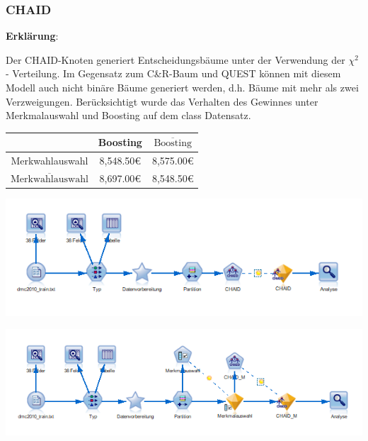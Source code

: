 \documentclass[a4paper,12pt]{article}
\begin{document}
\subsubsection{CHAID}
{\bf Erklärung}:
\par
\vspace{0.2cm}
Der CHAID-Knoten generiert Entscheidungsbäume unter der Verwendung der $\chi^2$  - Verteilung.
Im Gegensatz zum C\&R-Baum  und QUEST können mit diesem Modell auch nicht binäre Bäume generiert werden, d.h. Bäume mit mehr als zwei
Verzweigungen. Berücksichtigt wurde das Verhalten des Gewinnes unter Merkmalauswahl und Boosting auf dem class Datensatz. 

\begin{center}
\begin{tabular}{ c | c | c }
 & Boosting & $\overline{\text{Boosting}}$
\\
\hline
Merkwahlauswahl  &  8,548.50\;\euro & 8,575.00\;\euro
\\
$\overline{\text{Merkwahlauswahl}}$ & 8,697.00\;\euro  &  8,548.50\;\euro
\\
\end{tabular}
\end{center}

\begin{center}
\includegraphics[width=\textwidth]{Screens/chaid}
\end{center}

\begin{center}
\includegraphics[width=\textwidth]{Screens/chaid_m}
\end{center}
\end{document}
